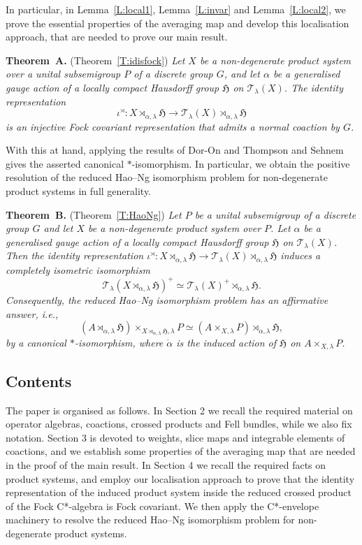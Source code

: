\documentclass[11pt,final]{amsart}
\numberwithin{equation}{section}
\theoremstyle{plain}
\theoremstyle{definition}
\theoremstyle{remark}
\newcommand{\T}{{\mathcal{T}}}
\def\al{\alpha}
\def\io{\iota}
\def\la{\lambda}
\newcommand{\fH}{{\mathfrak{H}}}
\begin{document}
In particular, in Lemma~\ref{L:local1}, Lemma~\ref{L:invar} and Lemma~\ref{L:local2}, we prove the essential properties of the averaging map and develop this localisation approach, that are needed to prove our main result.

\medskip

\noindent
\textbf{Theorem~A.}
(Theorem~\ref{T:idisfock})
{\it 
Let $X$ be a non-degenerate product system over a unital subsemigroup $P$ of a discrete group
$G$, and let $\al$ be a generalised gauge action of a locally compact Hausdorff group
$\fH$ on $\T_\la(X)$.  The identity representation
\[
\io^\rtimes \colon X\rtimes_{\al,\la}\fH
\to
\T_\la(X)\rtimes_{\al,\la}\fH
\]
is an injective Fock covariant representation that admits a normal coaction by $G$.
}

\medskip

With this at hand, applying the results of Dor-On and Thompson \cite{DT26} and Sehnem \cite{Seh22} gives the asserted canonical $*$-isomorphism. In particular, we obtain the positive resolution of the reduced Hao--Ng isomorphism problem for non-degenerate product systems in full generality.

\medskip

\noindent
\textbf{Theorem~B.}
(Theorem~\ref{T:HaoNg})
{\it 
Let $P$ be a unital subsemigroup of a discrete group $G$ and let $X$ be a non-degenerate product system over $P$.
Let $\al$ be a generalised gauge action of a locally compact Hausdorff group $\fH$ on $\T_\la(X)$.
Then the identity representation $\io^\rtimes \colon X\rtimes_{\al,\la}\fH \to \T_{\la}(X) \rtimes_{\al,\la} \fH$ induces a completely isometric isomorphism
\[
\T_\la(X \rtimes_{\al, \la} \fH)^+ \simeq \T_\la(X)^+ \rtimes_{\al, \la} \fH.
\]
Consequently, the reduced Hao--Ng isomorphism problem has an affirmative answer, i.e.,
\[
(A \rtimes_{\al, \la} \fH) \times_{X \rtimes_{\al, \la} \fH,\la} P
\simeq
(A \times_{X, \la} P) \rtimes_{\dot \al, \la} \fH,
\]
by a canonical $*$-isomorphism, where $\dot{\al}$ is the induced action of $\fH$ on $A \times_{X,\la} P$.
}

\subsection{Contents}
The paper is organised as follows.  In Section 2 we recall the required
material on operator algebras, coactions, crossed products and Fell bundles, while we also fix notation. Section 3 is
devoted to weights, slice maps and integrable elements of coactions, and we establish some properties of the averaging map that are needed in the proof of the main result.
In Section 4 we recall the required facts on product systems, and employ our localisation approach to prove that the identity representation of the induced product system inside the reduced crossed product of the Fock C*-algebra is Fock covariant. We then apply the C*-envelope machinery to resolve the reduced Hao--Ng isomorphism problem for non-degenerate product systems.
\end{document}

